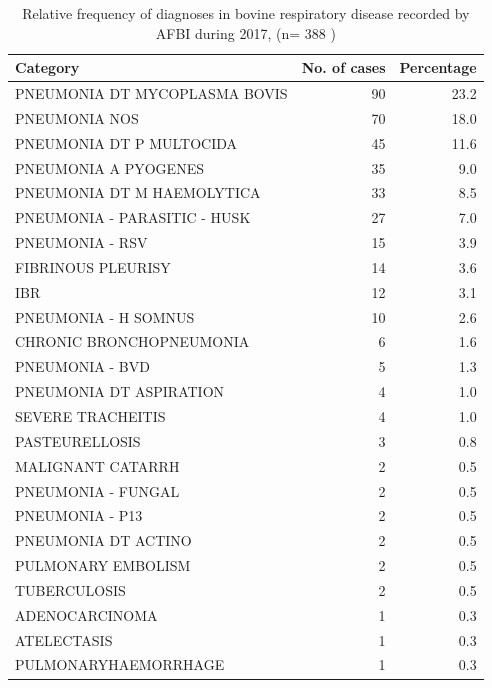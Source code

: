 \documentclass[]{book}
\begin{document}
\begin{table}

\caption{\label{tab:unnamed-chunk-26}Relative frequency of diagnoses in bovine respiratory disease recorded by AFBI during 2017, (n= 388 )}
\centering
\begin{tabular}[t]{l|r|r}
\hline
Category & No. of cases & Percentage\\
\hline
PNEUMONIA DT MYCOPLASMA BOVIS & 90 & 23.2\\
\hline
PNEUMONIA NOS & 70 & 18.0\\
\hline
PNEUMONIA DT P MULTOCIDA & 45 & 11.6\\
\hline
PNEUMONIA A PYOGENES & 35 & 9.0\\
\hline
PNEUMONIA DT M HAEMOLYTICA & 33 & 8.5\\
\hline
PNEUMONIA - PARASITIC - HUSK & 27 & 7.0\\
\hline
PNEUMONIA - RSV & 15 & 3.9\\
\hline
FIBRINOUS PLEURISY & 14 & 3.6\\
\hline
IBR & 12 & 3.1\\
\hline
PNEUMONIA - H SOMNUS & 10 & 2.6\\
\hline
CHRONIC BRONCHOPNEUMONIA & 6 & 1.6\\
\hline
PNEUMONIA - BVD & 5 & 1.3\\
\hline
PNEUMONIA DT ASPIRATION & 4 & 1.0\\
\hline
SEVERE TRACHEITIS & 4 & 1.0\\
\hline
PASTEURELLOSIS & 3 & 0.8\\
\hline
MALIGNANT CATARRH & 2 & 0.5\\
\hline
PNEUMONIA - FUNGAL & 2 & 0.5\\
\hline
PNEUMONIA - P13 & 2 & 0.5\\
\hline
PNEUMONIA DT ACTINO & 2 & 0.5\\
\hline
PULMONARY EMBOLISM & 2 & 0.5\\
\hline
TUBERCULOSIS & 2 & 0.5\\
\hline
ADENOCARCINOMA & 1 & 0.3\\
\hline
ATELECTASIS & 1 & 0.3\\
\hline
PULMONARYHAEMORRHAGE & 1 & 0.3\\
\hline
\end{tabular}
\end{table}
\end{document}
